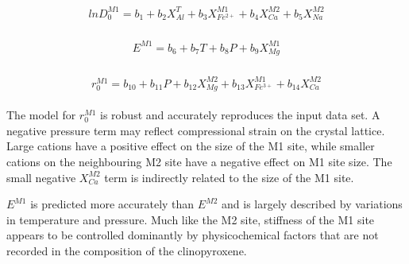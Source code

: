 \documentclass[review,authoryear,12pt]{elsarticle}
\begin{document}
     \begin{align} %
	\begin{split}
   lnD^{M1}_0 = b_1 + b_{2}X^{T}_{Al} + b_3X^{M1}_{Fe^{2+}} + b_4X^{M2}_{Ca} + b_5X^{M2}_{Na}
   	\end{split}
	\label{D0M1_eqn}
	\end{align}
	
	\begin{align} %
	\begin{split}
   E^{M1} = b_6 + b_{7}T + b_8P + b_9X^{M1}_{Mg}
	\end{split}
	\label{EM1_eqn}
	\end{align}
	
	\begin{align} %
	\begin{split}
   r^{M1}_0 = b_{10} + b_{11}P + b_{12}X^{M2}_{Mg} + b_{13}X^{M1}_{Fe^{3+}} + b_{14}X^{M2}_{Ca}
	\end{split}
	\label{r0M1_eqn}
	\end{align}

The model for $r_0^{M1}$ is robust and accurately reproduces the input data set. A negative pressure term may reflect compressional strain on the crystal lattice. Large  cations have a positive effect on the size of the M1 site, while smaller  cations on the neighbouring M2 site have a negative effect on M1 site size. The small negative $X^{M2}_{Ca}$ term is indirectly related to the size of the M1 site.

$E^{M1}$ is predicted more accurately than $E^{M2}$ and is largely described by variations in temperature and pressure. Much like the M2 site, stiffness of the M1 site appears to be controlled dominantly by physicochemical factors that are not recorded in the composition of the clinopyroxene.
\end{document}
